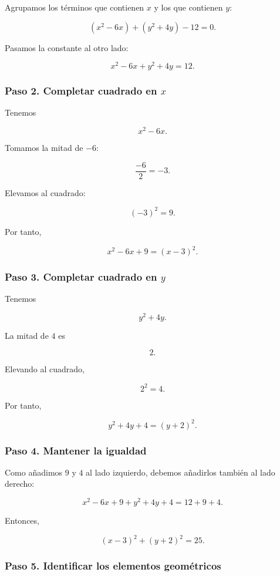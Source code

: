\documentclass[12pt]{article}
\begin{document}
{Agrupamos los términos que contienen \(x\) y los que contienen \(y\):

\[
(x^2-6x)+(y^2+4y)-12=0.
\]

Pasamos la constante al otro lado:

\[
x^2-6x+y^2+4y=12.
\]

\subsubsection*{Paso 2. Completar cuadrado en \(x\)}

Tenemos

\[
x^2-6x.
\]

Tomamos la mitad de \(-6\):

\[
\frac{-6}{2}=-3.
\]

Elevamos al cuadrado:

\[
(-3)^2=9.
\]

Por tanto,

\[
x^2-6x+9=(x-3)^2.
\]

\subsubsection*{Paso 3. Completar cuadrado en \(y\)}

Tenemos

\[
y^2+4y.
\]

La mitad de \(4\) es

\[
2.
\]

Elevando al cuadrado,

\[
2^2=4.
\]

Por tanto,

\[
y^2+4y+4=(y+2)^2.
\]

\subsubsection*{Paso 4. Mantener la igualdad}

Como añadimos \(9\) y \(4\) al lado izquierdo, debemos añadirlos también
al lado derecho:

\[
x^2-6x+9+y^2+4y+4
=
12+9+4.
\]

Entonces,

\[
(x-3)^2+(y+2)^2=25.
\]

\subsubsection*{Paso 5. Identificar los elementos geométricos}

}
\end{document}
